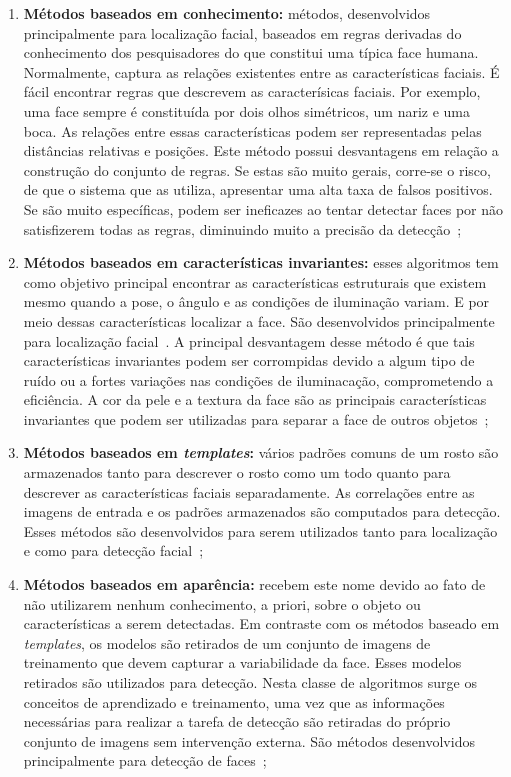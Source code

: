 	\begin{enumerate}
		\item \textbf{Métodos baseados em conhecimento:} métodos, desenvolvidos principalmente para localização facial, baseados em regras derivadas do conhecimento dos pesquisadores do que constitui uma típica face humana. Normalmente, captura as relações existentes entre as características faciais. É fácil encontrar regras que descrevem as caracterísicas faciais. Por exemplo, uma face sempre é constituída por dois olhos simétricos, um nariz e uma boca. As relações entre essas características podem ser representadas pelas distâncias relativas e posições. Este método possui desvantagens em relação a construção do conjunto de regras. Se estas são muito gerais, corre-se o risco, de que o sistema que as utiliza, apresentar uma alta taxa de falsos positivos. Se são muito específicas, podem ser ineficazes ao tentar detectar faces por não satisfizerem todas as regras, diminuindo muito a precisão da detecção~\cite{yang,lopes};

		\item \textbf{Métodos baseados em características invariantes:} esses algoritmos tem como objetivo principal encontrar as características estruturais que existem mesmo quando a pose, o ângulo e as condições de iluminação variam. E por meio dessas características localizar a face. São desenvolvidos principalmente para localização facial~\cite{yang}. A principal desvantagem desse método é que tais características invariantes podem ser corrompidas devido a algum tipo de ruído ou a fortes variações nas condições de iluminacação, comprometendo a eficiência. A cor da pele e a textura da face são as principais características invariantes que podem ser utilizadas para separar a face de outros objetos~\cite{lopes};

		\item \textbf{Métodos baseados em \textit{templates}:} vários padrões comuns de um rosto são armazenados tanto para descrever o rosto como um todo quanto para descrever as características faciais separadamente. As correlações entre as imagens de entrada e os padrões armazenados são computados para detecção. Esses métodos são desenvolvidos para serem utilizados tanto para localização e como para detecção facial~\cite{yang};

		\item \textbf{Métodos baseados em aparência:} recebem este nome devido ao fato de não utilizarem nenhum conhecimento, a priori, sobre o objeto ou características a serem detectadas. Em contraste com os métodos baseado em \textit{templates}, os modelos são retirados de um conjunto de imagens de treinamento que devem capturar a variabilidade da face. Esses modelos retirados são utilizados para detecção. Nesta classe de algoritmos surge os conceitos de aprendizado e treinamento, uma vez que as informações necessárias para realizar a tarefa de detecção são retiradas do próprio conjunto de imagens sem intervenção externa. São métodos desenvolvidos principalmente para detecção de faces~\cite{yang, lopes};

	\end{enumerate}

